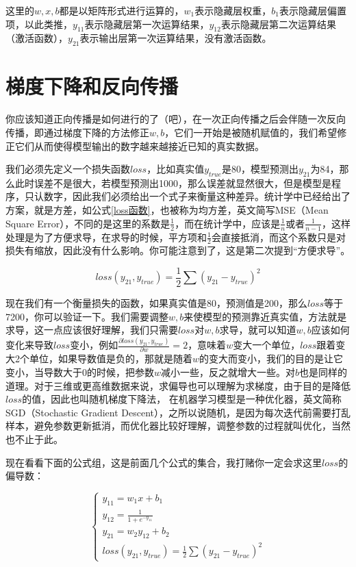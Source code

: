 \documentclass[a5paper, 11pt]{ctexbook}
\begin{document}
这里的$w, x, b$都是以矩阵形式进行运算的，$w_1$表示隐藏层权重，$b_1$表示隐藏层偏置项，以此类推，$y_{11}$表示隐藏层第一次运算结果，$y_{12}$表示隐藏层第二次运算结果（激活函数），$y_{21}$表示输出层第一次运算结果，没有激活函数。

\section{梯度下降和反向传播}

你应该知道正向传播是如何进行的了（吧），在一次正向传播之后会伴随一次反向传播，即通过梯度下降的方法修正$w, b$，它们一开始是被随机赋值的，我们希望修正它们从而使得模型输出的数字越来越接近已知的真实数据。

我们必须先定义一个损失函数$loss$，比如真实值$y_{true}$是80，模型预测出$y_{21}$为84，那么此时误差不是很大，若模型预测出1000，那么误差就显然很大，但是模型是程序，只认数字，因此我们必须给出一个式子来衡量这种差异。统计学中已经给出了方案，就是方差，如公式\ref{loss函数}，也被称为均方差，英文简写MSE（Mean Square Error），不同的是这里的系数是$\frac{1}{2}$，而在统计学中，应该是$\frac{1}{n}$或者$\frac{1}{n-1}$，这样处理是为了方便求导，在求导的时候，平方项和$\frac{1}{2}$会直接抵消，而这个系数只是对损失有缩放，因此没有什么影响。你可能注意到了，这是第二次提到“方便求导”。

\begin{equation}\label{loss函数}
    loss(y_{21}, y_{true}) = \frac{1}{2}\sum(y_{21} - y_{true})^2
\end{equation}

现在我们有一个衡量损失的函数，如果真实值是80，预测值是200，那么$loss$等于7200，你可以验证一下。我们需要调整$w, b$来使模型的预测靠近真实值，方法就是求导，这一点应该很好理解，我们只需要$loss$对$w, b$求导，就可以知道$w, b$应该如何变化来导致$loss$变小，例如$\frac{\partial{loss(y_{21}, y_{true})}}{\partial{w}}=2$，意味着$w$变大一个单位，$loss$跟着变大2个单位，如果导数值是负的，那就是随着$w$的变大而变小，我们的目的是让它变小，当导数大于0的时候，把参数$w$减小一些，反之就增大一些。对$b$也是同样的道理。对于三维或更高维数据来说，求偏导也可以理解为求梯度，由于目的是降低$loss$的值，因此也叫随机梯度下降法， 在机器学习模型是一种优化器，英文简称SGD（Stochastic Gradient Descent），之所以说随机，是因为每次迭代前需要打乱样本，避免参数更新抵消，而优化器比较好理解，调整参数的过程就叫优化，当然也不止于此。

现在看看下面的公式组，这是前面几个公式的集合，我打赌你一定会求这里$loss$的偏导数：

\begin{equation}
    \begin{cases}
        y_{11} = w_1x+b_1                \\
        y_{12} = \frac{1}{1+e^{-y_{11}}} \\
        y_{21} = w_2y_{12} + b_2         \\
        loss(y_{21}, y_{true}) = \frac{1}{2}\sum(y_{21} - y_{true})^2
    \end{cases}
\end{equation}
\end{document}
